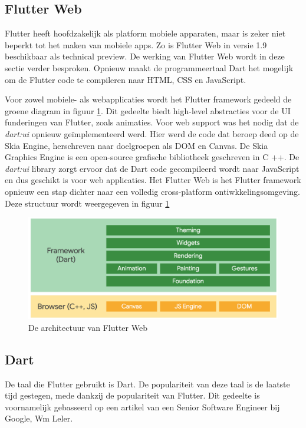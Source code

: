 
\subsection{Flutter Web}
Flutter heeft hoofdzakelijk als platform mobiele apparaten, maar is zeker niet beperkt tot het maken van mobiele apps. Zo is Flutter Web in versie 1.9 beschikbaar als technical preview. De werking van Flutter Web wordt in deze sectie verder besproken.
\newline
Opnieuw maakt de programmeertaal Dart het mogelijk om de Flutter code te compileren naar HTML, CSS en JavaScript.

Voor zowel mobiele- als webapplicaties wordt het Flutter framework gedeeld de groene diagram in figuur \ref{fig:flutter-web-architecture}. Dit gedeelte biedt high-level abstracties voor de UI funderingen van Flutter, zoals animaties. Voor web support was het nodig dat de \emph{dart:ui} opnieuw geïmplementeerd werd. Hier werd de code dat beroep deed op de Skia Engine, herschreven naar doelgroepen als DOM en Canvas. De Skia Graphics Engine is een open-source grafische bibliotheek geschreven in C ++. De \emph{dart:ui} library zorgt ervoor dat de Dart code gecompileerd wordt naar JavaScript en dus geschikt is voor web applicaties. 
\newline
Het Flutter Web is het Flutter framework opnieuw een stap dichter naar een volledig cross-platform ontiwkkelingsomgeving.
Deze structuur wordt weergegeven in figuur \ref{fig:flutter-web-architecture}
\begin{figure}[H]
    \includegraphics[width=\linewidth]{img/stand-van-zaken/flutter-web-architecture.png}
    \caption{De architectuur van Flutter Web}
    \label{fig:flutter-web-architecture}
\end{figure}


\subsection{Dart}
De taal die Flutter gebruikt is Dart. De populariteit van deze taal is de laatste tijd gestegen, mede dankzij de populariteit van Flutter.
Dit gedeelte is voornamelijk gebasseerd op een artikel van een Senior Software Engineer bij Google, Wm Leler.

